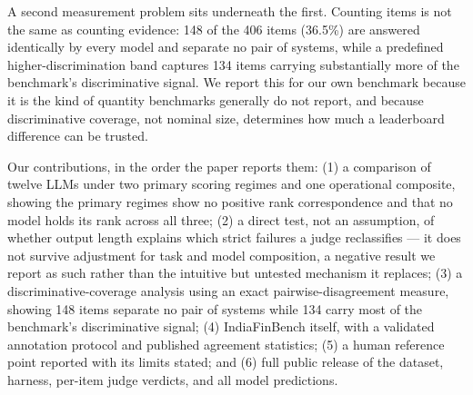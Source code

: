 A second measurement problem sits underneath the first. Counting items is not the same as counting
evidence: 148 of the 406 items (36.5\%) are answered identically by every model and separate no
pair of systems, while a predefined higher-discrimination band captures 134 items carrying
substantially more of the benchmark's discriminative signal. We report this for our own benchmark
because it is the kind of quantity benchmarks generally do not report, and because discriminative
coverage, not nominal size, determines how much a leaderboard difference can be trusted.

Our contributions, in the order the paper reports them: (1) a comparison of twelve LLMs under two
primary scoring regimes and one operational composite, showing the primary regimes show no positive
rank correspondence and that no model holds its rank across all three; (2) a direct test, not
an assumption, of whether output length explains which strict failures a judge reclassifies --- it
does not survive adjustment for task and model composition, a negative result we report as such
rather than the intuitive but untested mechanism it replaces; (3) a discriminative-coverage analysis
using an exact pairwise-disagreement measure, showing 148 items separate no pair of systems while
134 carry most of the benchmark's discriminative signal; (4) IndiaFinBench
itself, with a validated annotation protocol and published agreement statistics; (5) a human
reference point reported with its limits stated; and (6) full public release of the dataset, harness,
per-item judge verdicts, and all model predictions.
